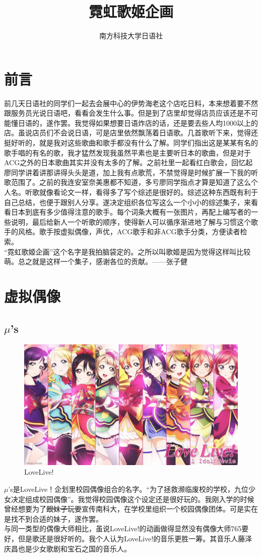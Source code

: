 \documentclass{ctexart}
\title{霓虹歌姬企画}
\author{南方科技大学日语社}
\begin{document}
\maketitle
\tableofcontents

\section{前言}
前几天日语社的同学们一起去会展中心的伊势海老这个店吃日料，本来想着要不然跟服务员光说日语吧，看看会发生什么事。但是到了店里却觉得店员应该还是不可能懂日语的，遂作罢。我觉得如果想要日语炸店的话，还是要去些人均1000以上的店。虽说店员们不会说日语，可是店里依然飘荡着日语歌。几首歌听下来，觉得还挺好听的，就是我对这些歌曲和歌手都没有什么了解。同学们指出这是某某有名的歌手唱的有名的歌，我才猛然发现我虽然平素也是主要听日本的歌曲，但是对于ACG之外的日本歌曲其实并没有太多的了解。之前社里一起看红白歌会，回忆起廖同学讲着讲那讲得头头是道，加上我有点歌荒，不禁觉得是时候扩展一下我的听歌范围了。之前的我连安室奈美惠都不知道，多亏廖同学指点才算是知道了这么个人名。听歌就像看论文一样，看得多了写个综述是很好的。综述这种东西既有利于自己总结，也便于跟别人分享。遂决定组织各位写这么一个小小的综述集子，来看看日本到底有多少值得注意的歌手。每个词条大概有一张图片，再配上编写者的一些说明，最后给新人一个听歌的顺序，使得新人可以循序渐进地了解与习惯这个歌手的风格。歌手按虚拟偶像，声优，ACG歌手和非ACG歌手分类，方便读者检索。\\
“霓虹歌姬企画”这个名字是我拍脑袋定的。之所以叫歌姬是因为觉得这样叫比较萌。总之就是这样一个集子，感谢各位的贡献。——张子健


\section{虚拟偶像}
\subsection{$\mu$'s}
\begin{figure}[h]
\centering
 \includegraphics[width=1.0\textwidth]{lovelive.jpg}
 \caption{LoveLive!}
\end{figure}
$\mu$'s是LoveLive！企划里校园偶像组合的名字。“为了拯救濒临废校的学校，九位少女决定组成校园偶像”。我觉得校园偶像这个设定还是很好玩的。我刚入学的时候曾经想要为了\sout{跟妹子玩耍}宣传南科大，在学校里组织一个校园偶像团体。可是实在是找不到合适的妹子，遂作罢。\\
与同一类型的偶像大师相比，虽说LoveLive!的动画做得显然没有偶像大师765要好，但是歌还是很好听的。我个人认为LoveLive!的音乐更胜一筹。其音乐人藤泽庆昌也是少女歌剧和宝石之国的音乐人。
\end{document}
